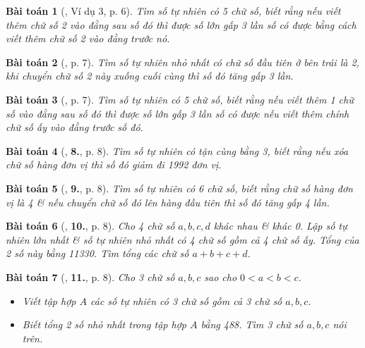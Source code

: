 \documentclass{article}
\numberwithin{equation}{section}
\newtheorem{baitoan}{Bài toán}[section]
\begin{document}
\begin{baitoan}[\cite{Binh_Toan_6_tap_1}, Ví dụ 3, p. 6]
	Tìm số tự nhiên có 5 chữ số, biết rằng nếu viết thêm chữ số 2 vào đằng sau số đó thì được số lớn gấp 3 lần số có được bằng cách viết thêm chữ số 2 vào đằng trước nó.
\end{baitoan}

\begin{baitoan}[\cite{Binh_Toan_6_tap_1}, p. 7]
	Tìm số tự nhiên nhỏ nhất có chữ số đầu tiên ở bên trái là 2, khi chuyển chữ số 2 này xuống cuối cùng thì số đó tăng gấp 3 lần.
\end{baitoan}

\begin{baitoan}[\cite{Binh_Toan_6_tap_1}, p. 7]
	Tìm số tự nhiên có 5 chữ số, biết rằng nếu viết thêm 1 chữ số vào đằng sau số đó thì được số lớn gấp 3 lần số có được nếu viết thêm chính chữ số ấy vào đằng trước số đó.
\end{baitoan}

\begin{baitoan}[\cite{Binh_Toan_6_tap_1}, \textbf{8.}, p. 8]
	Tìm số tự nhiên có tận cùng bằng 3, biết rằng nếu xóa chữ số hàng đơn vị thì số đó giảm đi 1992 đơn vị.
\end{baitoan}

\begin{baitoan}[\cite{Binh_Toan_6_tap_1}, \textbf{9.}, p. 8]
	Tìm số tự nhiên có 6 chữ số, biết rằng chữ số hàng đơn vị là 4 \& nếu chuyển chữ số đó lên hàng đầu tiên thì số đó tăng gấp 4 lần.
\end{baitoan}

\begin{baitoan}[\cite{Binh_Toan_6_tap_1}, \textbf{10.}, p. 8]
	Cho 4 chữ số $a,b,c,d$ khác nhau \& khác 0. Lập số tự nhiên lớn nhất \& số tự nhiên nhỏ nhất có 4 chữ số gồm cả 4 chữ số ấy. Tổng của 2 số này bằng 11330. Tìm tổng các chữ số $a + b + c + d$.
\end{baitoan}

\begin{baitoan}[\cite{Binh_Toan_6_tap_1}, \textbf{11.}, p. 8]
	Cho 3 chữ số $a,b,c$ sao cho $0 < a < b < c$.
	\begin{itemize}
		\item[(a)] Viết tập hợp $A$ các số tự nhiên có 3 chữ số gồm cả 3 chữ số $a,b,c$.
		\item[(b)] Biết tổng 2 số nhỏ nhất trong tập hợp $A$ bằng 488. Tìm 3 chữ số $a,b,c$ nói trên.
	\end{itemize}
\end{baitoan}
\end{document}
